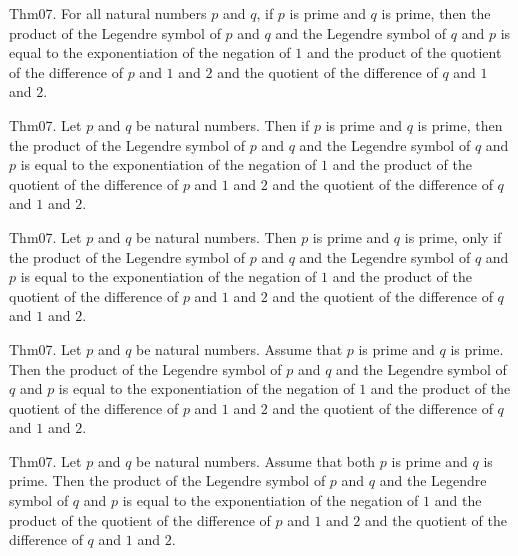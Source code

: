 \documentclass{article}
\begin{document}
Thm07. For all natural numbers $p$ and $q$, if $p$ is prime and $q$ is prime, then the product of the Legendre symbol of $p$ and $q$ and the Legendre symbol of $q$ and $p$ is equal to the exponentiation of the negation of $1$ and the product of the quotient of the difference of $p$ and $1$ and $2$ and the quotient of the difference of $q$ and $1$ and $2$.

Thm07. Let $p$ and $q$ be natural numbers. Then if $p$ is prime and $q$ is prime, then the product of the Legendre symbol of $p$ and $q$ and the Legendre symbol of $q$ and $p$ is equal to the exponentiation of the negation of $1$ and the product of the quotient of the difference of $p$ and $1$ and $2$ and the quotient of the difference of $q$ and $1$ and $2$.

Thm07. Let $p$ and $q$ be natural numbers. Then $p$ is prime and $q$ is prime, only if the product of the Legendre symbol of $p$ and $q$ and the Legendre symbol of $q$ and $p$ is equal to the exponentiation of the negation of $1$ and the product of the quotient of the difference of $p$ and $1$ and $2$ and the quotient of the difference of $q$ and $1$ and $2$.

Thm07. Let $p$ and $q$ be natural numbers. Assume that $p$ is prime and $q$ is prime. Then the product of the Legendre symbol of $p$ and $q$ and the Legendre symbol of $q$ and $p$ is equal to the exponentiation of the negation of $1$ and the product of the quotient of the difference of $p$ and $1$ and $2$ and the quotient of the difference of $q$ and $1$ and $2$.

Thm07. Let $p$ and $q$ be natural numbers. Assume that both $p$ is prime and $q$ is prime. Then the product of the Legendre symbol of $p$ and $q$ and the Legendre symbol of $q$ and $p$ is equal to the exponentiation of the negation of $1$ and the product of the quotient of the difference of $p$ and $1$ and $2$ and the quotient of the difference of $q$ and $1$ and $2$.
\end{document}
